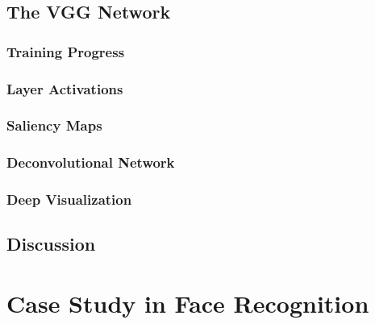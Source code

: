 \subsection{The VGG Network}

\subsubsection{Training Progress}

\subsubsection{Layer Activations}

\subsubsection{Saliency Maps}

\subsubsection{Deconvolutional Network}

\subsubsection{Deep Visualization}

\subsection{Discussion} %


\section{Case Study in Face Recognition}

\cleardoublepage